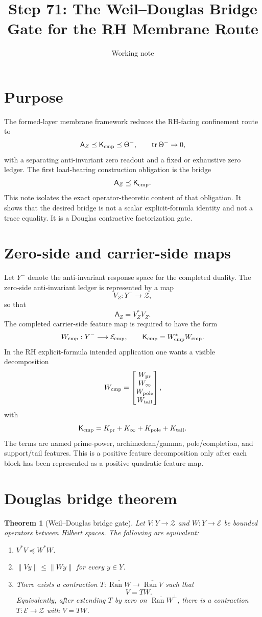 \documentclass[11pt]{article}
\title{Step 71: The Weil--Douglas Bridge Gate for the RH Membrane Route}
\author{Working note}
\date{}
\newtheorem{theorem}{Theorem}
\DeclareMathOperator{\Ran}{Ran}
\DeclareMathOperator{\tr}{tr}
\newcommand{\Kcmp}{\mathsf K_{\rm cmp}}
\newcommand{\AZ}{\mathsf A_Z}
\newcommand{\Ecmp}{\mathcal E_{\rm cmp}}
\begin{document}
\maketitle

\section{Purpose}
The formed-layer membrane framework reduces the RH-facing confinement route to
\[
  \AZ\preceq \Kcmp\preceq \Theta^- ,
  \qquad \tr\Theta^-\to0,
\]
with a separating anti-invariant zero readout and a fixed or exhaustive zero ledger.
The first load-bearing construction obligation is the bridge
\[
  \AZ\preceq\Kcmp.
\]
This note isolates the exact operator-theoretic content of that obligation.  It shows that the desired bridge is not a scalar explicit-formula identity and not a trace equality.  It is a Douglas contractive factorization gate.

\section{Zero-side and carrier-side maps}
Let $Y^-$ denote the anti-invariant response space for the completed duality.  The zero-side anti-invariant ledger is represented by a map
\[
   V_Z:Y^-\longrightarrow \mathcal Z,
\]
so that
\[
   \AZ=V_Z^*V_Z.
\]
The completed carrier-side feature map is required to have the form
\[
   W_{\rm cmp}:Y^-\longrightarrow \Ecmp,
   \qquad
   \Kcmp=W_{\rm cmp}^*W_{\rm cmp}.
\]
In the RH explicit-formula intended application one wants a visible decomposition
\[
   W_{\rm cmp}=\begin{bmatrix}
       W_{\rm pr}\\ W_\infty\\ W_{\rm pole}\\ W_{\rm tail}
   \end{bmatrix},
\]
with
\[
   \Kcmp=K_{\rm pr}+K_\infty+K_{\rm pole}+K_{\rm tail}.
\]
The terms are named prime-power, archimedean/gamma, pole/completion, and support/tail features.  This is a positive feature decomposition only after each block has been represented as a positive quadratic feature map.

\section{Douglas bridge theorem}
\begin{theorem}[Weil--Douglas bridge gate]
Let $V:Y\to\mathcal Z$ and $W:Y\to\mathcal E$ be bounded operators between Hilbert spaces.  The following are equivalent:
\begin{enumerate}[label=(\roman*)]
\item $V^*V\preceq W^*W$.
\item $\|Vy\|\le \|Wy\|$ for every $y\in Y$.
\item There exists a contraction $T:\overline{\Ran W}\to \overline{\Ran V}$ such that
\[
   V=TW.
\]
Equivalently, after extending $T$ by zero on $\overline{\Ran W}^{\perp}$, there is a contraction $T:\mathcal E\to\mathcal Z$ with $V=TW$.
\end{enumerate}
\end{theorem}
\end{document}
